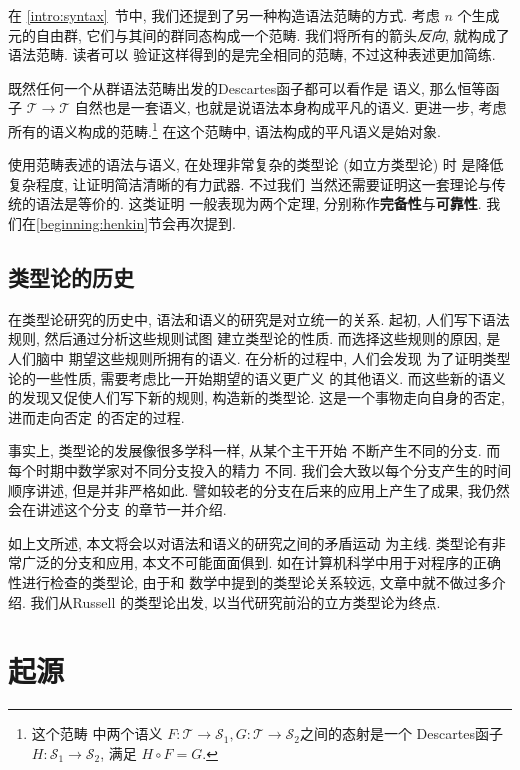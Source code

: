 \documentclass[UTF8]{ctexbook}
\theoremstyle{plain}
\theoremstyle{definition}
\theoremstyle{remark}
\begin{document}
在 \ref{intro:syntax}~节中, 我们还提到了另一种构造语法范畴的方式.
考虑 \(n\) 个生成元的自由群, 它们与其间的群同态构成一个范畴.
我们将所有的箭头\emph{反向}, 就构成了语法范畴. 读者可以
验证这样得到的是完全相同的范畴, 不过这种表述更加简练.

既然任何一个从群语法范畴出发的Descartes函子都可以看作是
语义, 那么恒等函子 \(\mathcal T \to \mathcal T\)
自然也是一套语义, 也就是说语法本身构成平凡的语义.
更进一步, 考虑所有的语义构成的范畴.\footnote{这个范畴
中两个语义 \(F : \mathcal T \to \mathcal S_1,
G : \mathcal T \to \mathcal S_2\)之间的态射是一个
Descartes函子 \(H : \mathcal S_1 \to \mathcal S_2\),
满足 \(H \circ F = G\).}
在这个范畴中, 语法构成的平凡语义是始对象.

使用范畴表述的语法与语义, 在处理非常复杂的类型论 (如立方类型论) 时
是降低复杂程度, 让证明简洁清晰的有力武器. 不过我们
当然还需要证明这一套理论与传统的语法是等价的. 这类证明
一般表现为两个定理, 分别称作\textbf{完备性}与\textbf{可靠性}.
我们在\ref{beginning:henkin}节会再次提到.


\section{类型论的历史}\label{intro:unity}
在类型论研究的历史中, 语法和语义的研究是对立统一的关系.
起初, 人们写下语法规则, 然后通过分析这些规则试图
建立类型论的性质. 而选择这些规则的原因, 是人们脑中
期望这些规则所拥有的语义. 在分析的过程中, 人们会发现
为了证明类型论的一些性质, 需要考虑比一开始期望的语义更广义
的其他语义. 而这些新的语义的发现又促使人们写下新的规则,
构造新的类型论. 这是一个事物走向自身的否定, 进而走向否定
的否定的过程.

事实上, 类型论的发展像很多学科一样, 从某个主干开始
不断产生不同的分支. 而每个时期中数学家对不同分支投入的精力
不同. 我们会大致以每个分支产生的时间顺序讲述, 但是并非严格如此.
譬如较老的分支在后来的应用上产生了成果, 我仍然会在讲述这个分支
的章节一并介绍.

如上文所述, 本文将会以对语法和语义的研究之间的矛盾运动
为主线. 类型论有非常广泛的分支和应用, 本文不可能面面俱到.
如在计算机科学中用于对程序的正确性进行检查的类型论, 由于和
数学中提到的类型论关系较远, 文章中就不做过多介绍. 我们从Russell
的类型论出发, 以当代研究前沿的立方类型论为终点.

\chapter{起源}
\end{document}
